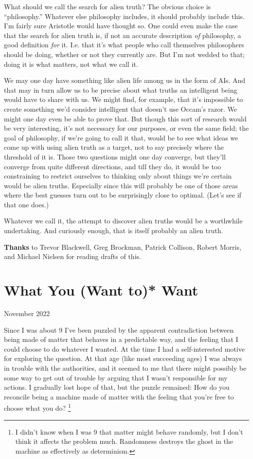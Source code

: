 \documentclass[12pt]{book}
\begin{document}
What should we call the search for alien truth? The obvious choice is
``philosophy.'' Whatever else philosophy includes, it should probably
include this. I'm fairly sure Aristotle would have thought so. One could
even make the case that the search for alien truth is, if not an
accurate description \emph{of} philosophy, a good definition \emph{for}
it. I.e. that it's what people who call themselves philosophers should
be doing, whether or not they currently are. But I'm not wedded to that;
doing it is what matters, not what we call it.

We may one day have something like alien life among us in the form of
AIs. And that may in turn allow us to be precise about what truths an
intelligent being would have to share with us. We might find, for
example, that it's impossible to create something we'd consider
intelligent that doesn't use Occam's razor. We might one day even be
able to prove that. But though this sort of research would be very
interesting, it's not necessary for our purposes, or even the same
field; the goal of philosophy, if we're going to call it that, would be
to see what ideas we come up with using alien truth as a target, not to
say precisely where the threshold of it is. Those two questions might
one day converge, but they'll converge from quite different directions,
and till they do, it would be too constraining to restrict ourselves to
thinking only about things we're certain would be alien truths.
Especially since this will probably be one of those areas where the best
guesses turn out to be surprisingly close to optimal. (Let's see if that
one does.)

Whatever we call it, the attempt to discover alien truths would be a
worthwhile undertaking. And curiously enough, that is itself probably an
alien truth.

\textbf{Thanks} to Trevor Blackwell, Greg Brockman, Patrick Collison,
Robert Morris, and Michael Nielsen for reading drafts of this.
\chapter{What You (Want to)* Want}

November 2022

Since I was about 9 I've been puzzled by the apparent contradiction
between being made of matter that behaves in a predictable way, and the
feeling that I could choose to do whatever I wanted. At the time I had a
self-interested motive for exploring the question. At that age (like
most succeeding ages) I was always in trouble with the authorities, and
it seemed to me that there might possibly be some way to get out of
trouble by arguing that I wasn't responsible for my actions. I gradually
lost hope of that, but the puzzle remained: How do you reconcile being a
machine made of matter with the feeling that you're free to choose what
you do? \footnote{I didn't know when I was 9 that matter might behave randomly,
but I don't think it affects the problem much. Randomness destroys the
ghost in the machine as effectively as determinism.}
\end{document}
